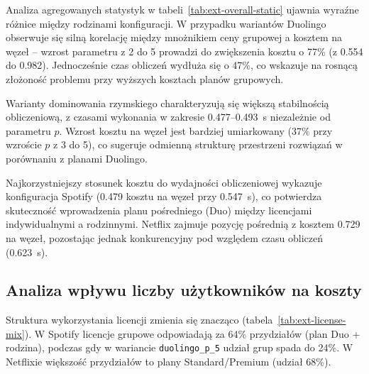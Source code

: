 Analiza agregowanych statystyk w tabeli~\ref{tab:ext-overall-static} ujawnia wyraźne różnice między rodzinami konfiguracji. W przypadku wariantów Duolingo obserwuje się silną korelację między mnożnikiem ceny grupowej a kosztem na węzeł -- wzrost parametru z 2 do 5 prowadzi do zwiększenia kosztu o 77\% (z 0.554 do 0.982). Jednocześnie czas obliczeń wydłuża się o 47\%, co wskazuje na rosnącą złożoność problemu przy wyższych kosztach planów grupowych.

Warianty dominowania rzymskiego charakteryzują się większą stabilnością obliczeniową, z czasami wykonania w zakresie 0.477--0.493~s niezależnie od parametru $p$. Wzrost kosztu na węzeł jest bardziej umiarkowany (37\% przy wzroście $p$ z 3 do 5), co sugeruje odmienną strukturę przestrzeni rozwiązań w porównaniu z planami Duolingo.

Najkorzystniejszy stosunek kosztu do wydajności obliczeniowej wykazuje konfiguracja Spotify (0.479 kosztu na węzeł przy 0.547~s), co potwierdza skuteczność wprowadzenia planu pośredniego (Duo) między licencjami indywidualnymi a rodzinnymi. Netflix zajmuje pozycję pośrednią z kosztem 0.729 na węzeł, pozostając jednak konkurencyjny pod względem czasu obliczeń (0.623~s).

\subsection{Analiza wpływu liczby użytkowników na koszty}

Struktura wykorzystania licencji zmienia się znacząco (tabela~\ref{tab:ext-license-mix}). W Spotify licencje grupowe odpowiadają za 64\% przydziałów (plan Duo + rodzina), podczas gdy w wariancie \texttt{duolingo\_p\_5} udział grup spada do 24\%. W Netflixie większość przydziałów to plany Standard/Premium (udział 68\%).

